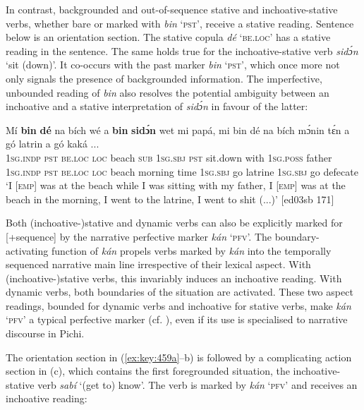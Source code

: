 In contrast, backgrounded and out-of-sequence stative and inchoative-stative verbs, whether bare or marked with \textit{bin} ‘\textsc{pst}’, receive a stative reading. Sentence  below is an orientation section. The stative copula \textit{dé} \textsc{‘be.loc’} has a stative reading in the sentence. The same holds true for the inchoative-stative verb \textit{sidɔ́n} ‘sit (down)’. It co-occurs with the past marker \textit{bin} ‘\textsc{pst}’, which once more not only signals the presence of backgrounded information. The imperfective, unbounded reading of \textit{bin} also resolves the potential ambiguity between an inchoative and a stative interpretation of \textit{sidɔ́n} in favour of the latter:


\ea%
    \label{ex:key:458}
    \gll Mí    \textbf{bin}  \textbf{dé}    na  bích    wé  a    \textbf{bin}  \textbf{sidɔ́n}  wet
mi    papá,  mi    bin  dé    na  bích    mɔ́nin  tɛ́n 
a    gó  latrin  a    gó  kaká  \op...\cp{}\\
\textsc{1sg.indp}  \textsc{pst}  \textsc{be.loc}  \textsc{loc}  beach  \textsc{sub}  \textsc{1sg.sbj}  \textsc{pst}  sit.down  with
\textsc{1sg.poss}  father  \textsc{1sg.indp}  \textsc{pst}  \textsc{be.loc}  \textsc{loc}  beach  morning  time
\textsc{1sg.sbj}  go  latrine  \textsc{1sg.sbj}  go  defecate\\

\glt ‘I [\textsc{emp}] was at the beach while I was sitting with my father, I [\textsc{emp}] was 
at the beach in the morning, I went to the latrine, I went to shit (...)’ [ed03sb 171]
\z

Both (inchoative-)stative and dynamic verbs can also be explicitly marked for [+sequence] by the narrative perfective marker \textit{kán} ‘\textsc{pfv}’. The boundary-activating function of \textit{kán} propels verbs marked by \textit{kán} into the temporally sequenced narrative main line irrespective of their lexical aspect. With (inchoative-)stative verbs, this invariably induces an inchoative reading. With dynamic verbs, both boundaries of the situation are activated. These two aspect readings, bounded for dynamic verbs and inchoative for stative verbs, make \textit{kán} ‘\textsc{pfv}’ a typical perfective marker (cf. \citealt[11–14]{Sasse1991}), even if its use is specialised to narrative discourse in Pichi. 


The orientation section in (\ref{ex:key:459a}–b) is followed by a complicating action section in (c), which contains the first foregrounded situation, the inchoative-stative verb \textit{sabí} ‘(get to) know’. The verb is marked by \textit{kán} ‘\textsc{pfv}’ and receives an inchoative reading: 



